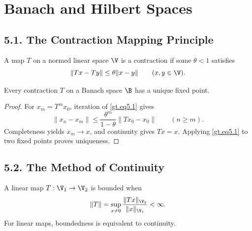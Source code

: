 \chapter{Banach and Hilbert Spaces}

\section*{5.1. The Contraction Mapping Principle}

\begin{definition}\label{gt.def5.1.contraction-mapping}
A map $T$ on a normed linear space $\V$ is a contraction if some $\theta<1$
satisfies
\begin{equation}\label{gt.eq5.1}
\|Tx-Ty\|\leq\theta\|x-y\| \qquad (x,y\in\V).
\end{equation}
\end{definition}

\begin{theorem}\label{gt.thm5.1}
Every contraction $T$ on a Banach space $\B$ has a unique fixed point.
\end{theorem}
\begin{proof}
\sketch For $x_m=T^m x_0$, iteration of \eqref{gt.eq5.1} gives
\[
\|x_n-x_m\|\leq \frac{\theta^m}{1-\theta}\|Tx_0-x_0\|
\qquad(n\geq m).
\]
Completeness yields $x_m\to x$, and continuity gives $Tx=x$. Applying
\eqref{gt.eq5.1} to two fixed points proves uniqueness.
\end{proof}

\section*{5.2. The Method of Continuity}

\begin{definition}\label{gt.def5.2.bounded-linear-operator}
A linear map $T:\V_1\to\V_2$ is bounded when
\begin{equation}\label{gt.eq5.2}
\|T\|=\sup_{x\neq0}\frac{\|Tx\|_{\V_2}}{\|x\|_{\V_1}}<\infty.
\end{equation}
For linear maps, boundedness is equivalent to continuity.
\end{definition}

